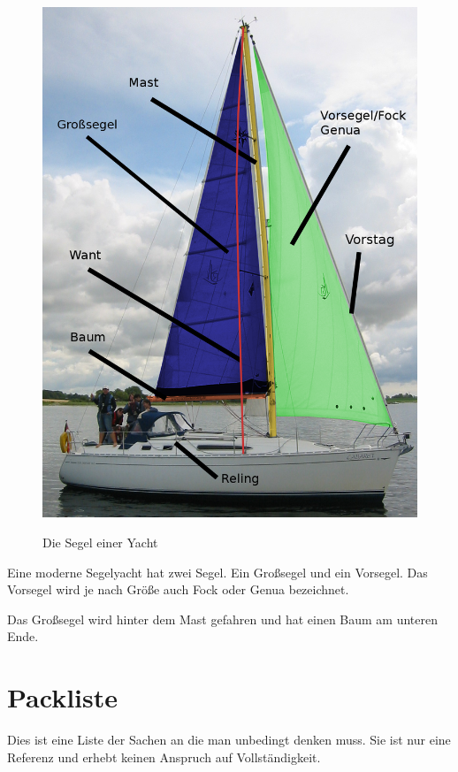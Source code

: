 \documentclass[12pt]{article}
\begin{document}
\begin{figure}[h!]
\begin{center}
\label{segel}
\includegraphics[scale=0.2]{bilder/yacht.png}
\end{center}
\caption{Die Segel einer Yacht}
\end{figure}

Eine moderne Segelyacht hat zwei Segel. Ein Großsegel und ein Vorsegel.
Das Vorsegel wird je nach Größe auch Fock oder Genua bezeichnet.

Das Großsegel wird hinter dem Mast gefahren und hat einen Baum am unteren Ende.

\section{Packliste}
Dies ist eine Liste der Sachen an die man unbedingt denken muss. Sie ist nur eine Referenz und erhebt keinen Anspruch auf Vollständigkeit.
\end{document}
